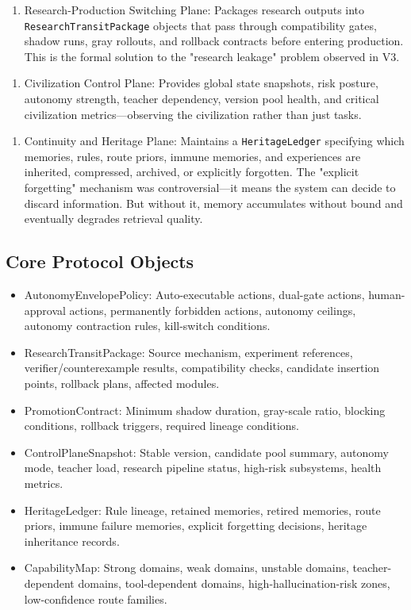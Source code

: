 \documentclass[12pt,a4paper]{article}
\begin{document}
\begin{enumerate}
  \item Research-Production Switching Plane: Packages research outputs into \texttt{ResearchTransitPackage} objects that pass through compatibility gates, shadow runs, gray rollouts, and rollback contracts before entering production. This is the formal solution to the "research leakage" problem observed in V3.
\end{enumerate}

\begin{enumerate}
  \item Civilization Control Plane: Provides global state snapshots, risk posture, autonomy strength, teacher dependency, version pool health, and critical civilization metrics---observing the civilization rather than just tasks.
\end{enumerate}

\begin{enumerate}
  \item Continuity and Heritage Plane: Maintains a \texttt{HeritageLedger} specifying which memories, rules, route priors, immune memories, and experiences are inherited, compressed, archived, or explicitly forgotten. The "explicit forgetting" mechanism was controversial---it means the system can decide to discard information. But without it, memory accumulates without bound and eventually degrades retrieval quality.
\end{enumerate}

\subsection{Core Protocol Objects}


\begin{itemize}
  \item AutonomyEnvelopePolicy: Auto-executable actions, dual-gate actions, human-approval actions, permanently forbidden actions, autonomy ceilings, autonomy contraction rules, kill-switch conditions.
  \item ResearchTransitPackage: Source mechanism, experiment references, verifier/counterexample results, compatibility checks, candidate insertion points, rollback plans, affected modules.
  \item PromotionContract: Minimum shadow duration, gray-scale ratio, blocking conditions, rollback triggers, required lineage conditions.
  \item ControlPlaneSnapshot: Stable version, candidate pool summary, autonomy mode, teacher load, research pipeline status, high-risk subsystems, health metrics.
  \item HeritageLedger: Rule lineage, retained memories, retired memories, route priors, immune failure memories, explicit forgetting decisions, heritage inheritance records.
  \item CapabilityMap: Strong domains, weak domains, unstable domains, teacher-dependent domains, tool-dependent domains, high-hallucination-risk zones, low-confidence route families.
\end{itemize}
\end{document}
